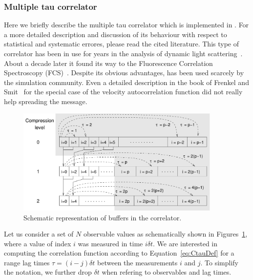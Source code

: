 \subsubsection{Multiple tau correlator}
\label{sec:multipleTau}

Here we briefly describe the multiple tau correlator which is implemented in \es.
For a more detailed description and discussion of its behaviour with respect to
statistical and systematic errores, please read the cited literature.
This type of correlator has been in use for years in the analysis of
dynamic light scattering~\cite{schatzel88a}. About a decade later it found its way
to the Fluorescence Correlation Spectroscopy (FCS)~\cite{magatti01a}.
Despite its obvious advantages, has been used scarcely by the simulation community.
Even a detailed description in the book of Frenkel and Smit~\cite{frenkel02b}
for the special case of the velocity autocorrelation function did not really
help spreading the message.

\begin{figure}[ht]
\begin{center} 
\includegraphics[width=0.9\textwidth]{figures/correlator_scheme}
\end{center} 
\caption{Schematic representation of buffers in the correlator.}
\label{fig:dataSet}
\end{figure}

Let us consider a set of $N$ observable values as schematically shown
in Figures~\ref{fig:dataSet}, where a value of index $i$ was measured
in time $i\delta t$. We are interested in computing the correlation 
function according to Equation~\ref{eq:CtauDef} for a range lag times
$\tau = (i-j)\delta t$ between the measurements $i$ and $j$.
To simplify the notation, we further drop $\delta t$
when refering to observables and lag times. 

